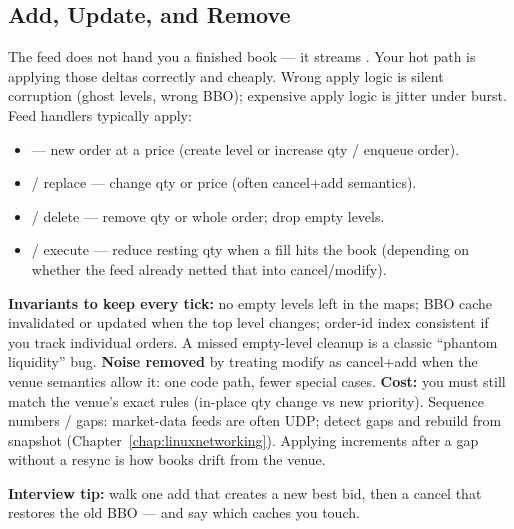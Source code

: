 \subsection{Add, Update, and Remove}
\label{subsec:order-book-operations}
The feed does not hand you a finished book --- it streams . Your hot path 
is applying those deltas correctly and cheaply. Wrong apply logic is silent corruption 
(ghost levels, wrong BBO); expensive apply logic is jitter under burst.
\newline
Feed handlers typically apply:
\begin{itemize}
    \item {} --- new order at a price (create level or increase qty / enqueue order).
    \item {} / replace --- change qty or price (often cancel+add semantics).
    \item {} / delete --- remove qty or whole order; drop empty levels.
    \item {} / execute --- reduce resting qty when a fill hits the book 
          (depending on whether the feed already netted that into cancel/modify).
\end{itemize}
\textbf{Invariants to keep every tick:} no empty levels left in the maps; BBO cache 
invalidated or updated when the top level changes; order-id index consistent if you track 
individual orders. A missed empty-level cleanup is a classic ``phantom liquidity'' bug.
\newline
\textbf{Noise removed} by treating modify as cancel+add when the venue semantics allow it: 
one code path, fewer special cases. \textbf{Cost:} you must still match the venue's exact 
rules (in-place qty change vs new priority).
\newline
Sequence numbers / gaps: market-data feeds are often UDP; detect gaps and rebuild from 
snapshot (Chapter~\ref{chap:linuxnetworking}). Applying increments after a gap without a 
resync is how books drift from the venue.
\par\noindent\textbf{Interview tip:} walk one add that creates a new best bid, then a cancel 
that restores the old BBO --- and say which caches you touch.

